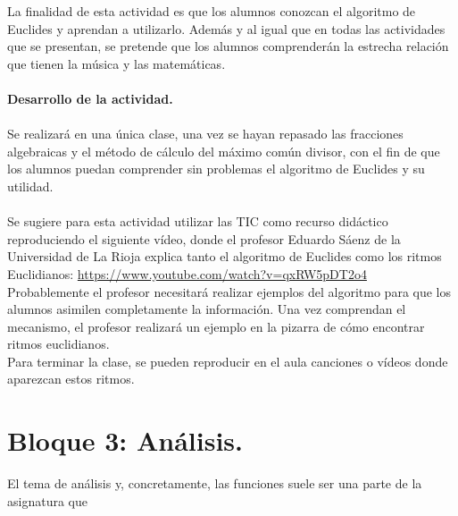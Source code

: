 \documentclass[a4paper, openright, 11pt, titlepage]{report}
\theoremstyle{definition}\newtheorem{defin}[propo]{Definition}
\theoremstyle{definition}\newtheorem{obser}[propo]{Remark}
\theoremstyle{definition}\newtheorem{ejem}[propo]{Ejemplo}
\theoremstyle{definition}\newtheorem{algoritmo}[propo]{Algoritmo}
\begin{document}
\begin{itemize}
    La finalidad de esta actividad es que los alumnos conozcan el algoritmo de Euclides y aprendan a utilizarlo. Además y al igual que en todas las actividades que se presentan, se pretende que los alumnos comprenderán la estrecha relación que tienen la música y las matemáticas.\\\\
    \textbf{Desarrollo de la actividad.}\\\\
    Se realizará en una única clase, una vez se hayan repasado las fracciones algebraicas y el método de cálculo del máximo común divisor, con el fin de que los alumnos puedan comprender sin problemas el algoritmo de Euclides y su utilidad.\\\\
    Se sugiere para esta actividad utilizar las TIC como recurso didáctico reproduciendo el siguiente vídeo, donde el profesor Eduardo Sáenz de la Universidad de La Rioja explica tanto el algoritmo de Euclides como los ritmos Euclidianos: \url{https://www.youtube.com/watch?v=qxRW5pDT2o4}\\
    Probablemente el profesor necesitará realizar ejemplos del algoritmo para que los alumnos asimilen completamente la información. Una vez comprendan el mecanismo, el profesor realizará un ejemplo en la pizarra de cómo encontrar ritmos euclidianos.\\
    Para terminar la clase, se pueden reproducir en el aula canciones o vídeos donde aparezcan estos ritmos. 
\end{itemize}
\chapter{Bloque 3: Análisis.}
El tema de análisis y, concretamente, las funciones suele ser una parte de la asignatura que 
\end{document}
